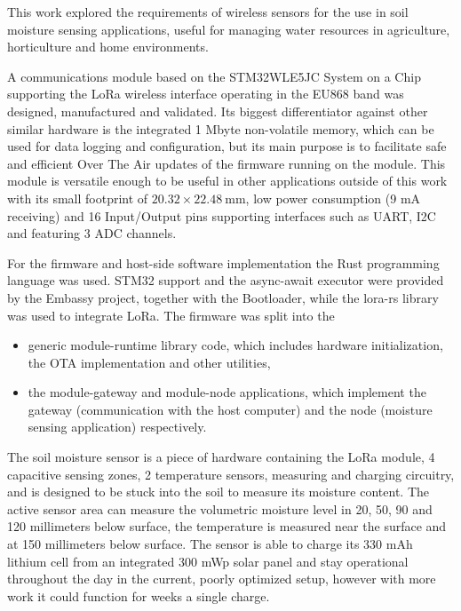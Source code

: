 
This work explored the requirements of wireless sensors for the use in soil moisture sensing applications, useful for managing water resources in agriculture, horticulture and home environments.

A communications module based on the STM32WLE5JC System on a Chip supporting the LoRa wireless interface operating in the EU868 band was designed, manufactured and validated. Its biggest differentiator against other similar hardware is the integrated 1 Mbyte non-volatile memory, which can be used for data logging and configuration, but its main purpose is to facilitate safe and efficient Over The Air updates of the firmware running on the module. This module is versatile enough to be useful in other applications outside of this work with its small footprint of $20.32 \times 22.48~\mathrm{mm}$, low power consumption (9 mA receiving) and 16 Input/Output pins supporting interfaces such as UART, I2C and featuring 3 ADC channels.

For the firmware and host-side software implementation the Rust programming language was used. STM32 support and the async-await executor were provided by the Embassy project, together with the Bootloader, while the lora-rs library was used to integrate LoRa. The firmware was split into the 
\begin{itemize}
    \item generic module-runtime library code, which includes hardware initialization, the OTA implementation and other utilities,
    \item the module-gateway and module-node applications, which implement the gateway (communication with the host computer) and the node (moisture sensing application) respectively.
\end{itemize}

The soil moisture sensor is a piece of hardware containing the LoRa module, 4 capacitive sensing zones, 2 temperature sensors, measuring and charging circuitry, and is designed to be stuck into the soil to measure its moisture content. The active sensor area can measure the volumetric moisture level in 20, 50, 90 and 120 millimeters below surface, the temperature is measured near the surface and at 150 millimeters below surface. The sensor is able to charge its 330 mAh lithium cell from an integrated 300 mWp solar panel and stay operational throughout the day in the current, poorly optimized setup, however with more work it could function for weeks a single charge.

